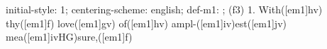 initial-style: 1;
centering-scheme: english;
def-m1: \grealign;
(f3) 1. With([em1]hv) thy([em1]f) love([em1]gv) of([em1]hv) ampl-([em1]iv)est([em1]jv) mea([em1]ivHG)sure,([em1]f)